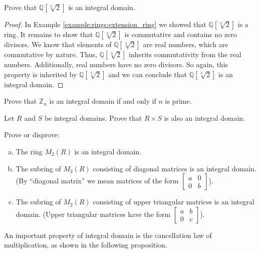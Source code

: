 \begin{example}
Prove that ${\mathbb Q}[\sqrt[3]{2}]$ is an integral domain.

\begin{proof}
In Example \ref{example:rings:extension_ring} we showed that ${\mathbb Q}[\sqrt[3]{2}]$ is a ring.  It remains to show that ${\mathbb Q}[\sqrt[3]{2}]$ is commutative and contains no zero divisors.  We know that elements of ${\mathbb Q}[\sqrt[3]{2}]$ are real numbers, which are commutative by nature.  Thus, ${\mathbb Q}[\sqrt[3]{2}]$ inherits commutativity from the real numbers.  Additionally, real numbers have no zero divisors.  So again, this property is inherited by ${\mathbb Q}[\sqrt[3]{2}]$ and we can conclude that ${\mathbb Q}[\sqrt[3]{2}]$ is an integral domain.
\end{proof}
\end{example}

\begin{exercise}
Prove that  ${\mathbb Z}_n$ is an integral domain if and only if $n$ is prime.
\end{exercise}

\begin{exercise}
Let $R$ and $S$ be integral domains. Prove that $R\times S$ is also an integral domain.
\end{exercise}

\begin{exercise}
Prove or disprove:
\begin{enumerate}[(a)]
\item
The ring $M_2(R)$ is an integral domain.
\item
The subring of $M_2(R)$ consisting of diagonal matrices is an integral domain. (By ``diagonal matrix'' we mean matrices of the form 
$ \begin{bmatrix}
a & 0 \\ 0 & b
\end{bmatrix}$).
\item
The subring of $M_2(R)$ consisting of upper triangular matrices is an integral domain. (Upper triangular matrices have the form 
$ \begin{bmatrix}
a & b \\ 0 & c
\end{bmatrix}$).
\end{enumerate}
\end{exercise}

An important property of integral domain is the cancellation law of multiplication, as shown in the following proposition.


